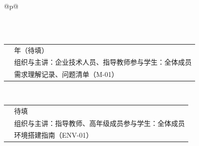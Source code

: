 \begin{longtable}{@{}p{\linewidth}@{}}
\caption{OH 俱乐部培训与技术研究活动记录表}\label{tab:2-2}\\
\endfirsthead
{}\\[4pt]
\endhead
\endfoot\endlastfoot
\begin{minipage}{\linewidth}
\begin{tabular}{@{}>{\raggedright\arraybackslash}p{}>{\raggedright\arraybackslash}p{}@{}}
\hline
\rowcolor{WordTableHeader}\multicolumn{2}{@{}p{\linewidth}@{}}{\RecordHeading{编号：T-01\quad 活动主题：命题解读：高密部署智能体沙箱引擎的任务边界与验收口径}} \\ \hline
\rowcolor{white} \TableHeaderText{时间} & 2026 年（待填） \\ \hline
\rowcolor{white} \TableHeaderText{组织与参与} & 组织与主讲：企业技术人员、指导教师\newline 参与学生：全体成员 \\ \hline
\rowcolor{white} \TableHeaderText{形成材料} & 需求理解记录、问题清单（M-01） \\ \hline
\end{tabular}
\end{minipage} \\[6pt]
\begin{minipage}{\linewidth}
\begin{tabular}{@{}>{\raggedright\arraybackslash}p{}>{\raggedright\arraybackslash}p{}@{}}
\hline
\rowcolor{WordTableHeader}\multicolumn{2}{@{}p{\linewidth}@{}}{\RecordHeading{编号：T-02\quad 活动主题：openEuler /\allowbreak{} Conch 与 StratoVirt 技术栈入门}} \\ \hline
\rowcolor{white} \TableHeaderText{时间} & 待填 \\ \hline
\rowcolor{white} \TableHeaderText{组织与参与} & 组织与主讲：指导教师、高年级成员\newline 参与学生：全体成员 \\ \hline
\rowcolor{white} \TableHeaderText{形成材料} & 环境搭建指南（ENV-01） \\ \hline
\end{tabular}
\end{minipage} \\[6pt]
\begin{minipage}{\linewidth}
\begin{tabular}{@{}>{\raggedright\arraybackslash}p{}>{\raggedright\arraybackslash}p{}@{}}

\end{tabular}
\end{minipage}
\end{longtable}
